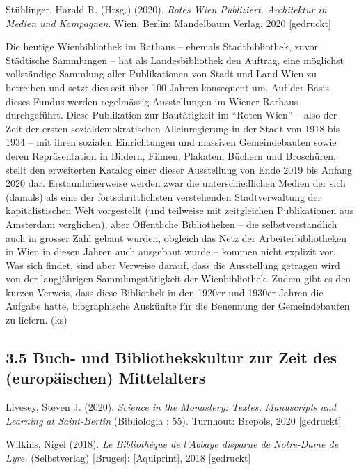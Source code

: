 \documentclass[a4paper,
fontsize=11pt,
oneside,
numbers=noperiodatend,
parskip=half-,
bibliography=totoc,
final
]{scrartcl}
\begin{document}
Stühlinger, Harald R. (Hrsg.) (2020). \emph{Rotes Wien Publiziert.
Architektur in Medien und Kampagnen}. Wien, Berlin: Mandelbaum Verlag,
2020 {[}gedruckt{]}

Die heutige Wienbibliothek im Rathaus -- ehemals Stadtbibliothek, zuvor
Städtische Sammlungen -- hat als Landesbibliothek den Auftrag, eine
möglichst vollständige Sammlung aller Publikationen von Stadt und Land
Wien zu betreiben und setzt dies seit über 100 Jahren konsequent um. Auf
der Basis dieses Fundus werden regelmässig Ausstellungen im Wiener
Rathaus durchgeführt. Diese Publikation zur Bautätigkeit im
\enquote{Roten Wien} -- also der Zeit der ersten sozialdemokratischen
Alleinregierung in der Stadt von 1918 bis 1934 -- mit ihren sozialen
Einrichtungen und massiven Gemeindebauten sowie deren Repräsentation in
Bildern, Filmen, Plakaten, Büchern und Broschüren, stellt den
erweiterten Katalog einer dieser Ausstellung von Ende 2019 bis Anfang
2020 dar. Erstaunlicherweise werden zwar die unterschiedlichen Medien
der sich (damals) als eine der fortschrittlichsten verstehenden
Stadtverwaltung der kapitalistischen Welt vorgestellt (und teilweise mit
zeitgleichen Publikationen aus Amsterdam verglichen), aber Öffentliche
Bibliotheken -- die selbstverständlich auch in grosser Zahl gebaut
wurden, obgleich das Netz der Arbeiterbibliotheken in Wien in diesen
Jahren auch ausgebaut wurde -- kommen nicht explizit vor. Was sich
findet, sind aber Verweise darauf, dass die Ausstellung getragen wird
von der langjährigen Sammlungstätigkeit der Wienbibliothek. Zudem gibt
es den kurzen Verweis, dass diese Bibliothek in den 1920er und 1930er
Jahren die Aufgabe hatte, biographische Auskünfte für die Benennung der
Gemeindebauten zu liefern. (ks)

\hypertarget{buch--und-bibliothekskultur-zur-zeit-des-europuxe4ischen-mittelalters}{%
\subsection{3.5 Buch- und Bibliothekskultur zur Zeit des (europäischen)
Mittelalters}\label{buch--und-bibliothekskultur-zur-zeit-des-europuxe4ischen-mittelalters}}

Livesey, Steven J. (2020). \emph{Science in the Monastery: Textes,
Manuscripts and Learning at Saint-Bertin} (Bibliologia ; 55). Turnhout:
Brepols, 2020 {[}gedruckt{]}

Wilkins, Nigel (2018). \emph{Le Bibliothèque de l'Abbaye disparue de
Notre-Dame de Lyre.} (Selbstverlag) {[}Bruges{]}: {[}Aquiprint{]}, 2018
{[}gedruckt{]}
\end{document}
